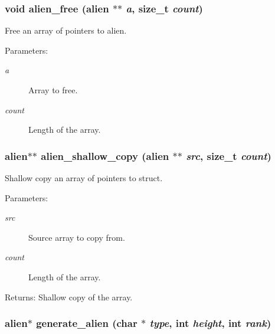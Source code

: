 \subsubsection{\setlength{\rightskip}{0pt plus 5cm}void alien\_\-free (\bf{alien} $\ast$$\ast$ {\em a}, size\_\-t {\em count})}\label{struct_8c_aeff06edf6a2f1d6e3ccd814b2c2f846}


Free an array of pointers to alien. 

\begin{Desc}
\item[Parameters:]
\begin{description}
\item[{\em a}]Array to free. \item[{\em count}]Length of the array. \end{description}
\end{Desc}
\subsubsection{\setlength{\rightskip}{0pt plus 5cm}\bf{alien}$\ast$$\ast$ alien\_\-shallow\_\-copy (\bf{alien} $\ast$$\ast$ {\em src}, size\_\-t {\em count})}\label{struct_8c_bd50f4a20ff4aba4bf09d382940ac130}


Shallow copy an array of pointers to struct. 

\begin{Desc}
\item[Parameters:]
\begin{description}
\item[{\em src}]Source array to copy from. \item[{\em count}]Length of the array. \end{description}
\end{Desc}
\begin{Desc}
\item[Returns:]Shallow copy of the array. \end{Desc}
\subsubsection{\setlength{\rightskip}{0pt plus 5cm}\bf{alien}$\ast$ generate\_\-alien (char $\ast$ {\em type}, int {\em height}, int {\em rank})}\label{struct_8c_ed439d27d4e904f0b6fe86638dcb1589}


